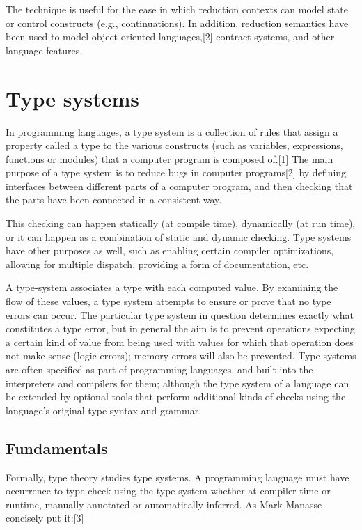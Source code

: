 \documentclass[12pt,b5paper]{book}
\theoremstyle{definition}
\begin{document}
The technique is useful for the ease in which reduction contexts can model state or control constructs (e.g., continuations). In addition, reduction semantics have been used to model object-oriented languages,[2] contract systems, and other language features.


\chapter{Type systems}
In programming languages, a type system is a collection of rules that assign a property called a type to the various constructs (such as variables, expressions, functions or modules) that a computer program is composed of.[1] The main purpose of a type system is to reduce bugs in computer programs[2] by defining interfaces between different parts of a computer program, and then checking that the parts have been connected in a consistent way. 

This checking can happen statically (at compile time), dynamically (at run time), or it can happen as a combination of static and dynamic checking. Type systems have other purposes as well, such as enabling certain compiler optimizations, allowing for multiple dispatch, providing a form of documentation, etc.

A type-system associates a type with each computed value. By examining the flow of these values, a type system attempts to ensure or prove that no type errors can occur. The particular type system in question determines exactly what constitutes a type error, but in general the aim is to prevent operations expecting a certain kind of value from being used with values for which that operation does not make sense (logic errors); memory errors will also be prevented. Type systems are often specified as part of programming languages, and built into the interpreters and compilers for them; although the type system of a language can be extended by optional tools that perform additional kinds of checks using the language's original type syntax and grammar.

\section{Fundamentals}

Formally, type theory studies type systems. A programming language must have occurrence to type check using the type system whether at compiler time or runtime, manually annotated or automatically inferred. As Mark Manasse concisely put it:[3]
\end{document}
